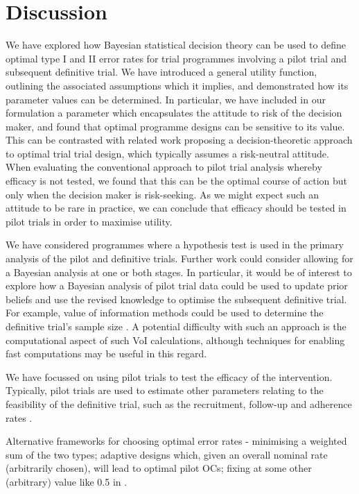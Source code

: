 \documentclass[sagev, Crown]{sagej}
\begin{document}

\section{Discussion}\label{sec:discussion}

We have explored how Bayesian statistical decision theory can be used to define optimal type I and II error rates for trial programmes involving a pilot trial and subsequent definitive trial. We have introduced a general utility function, outlining the associated assumptions which it implies, and demonstrated how its parameter values can be determined. In particular, we have included in our formulation a parameter which encapsulates the attitude to risk of the decision maker, and found that optimal programme designs can be sensitive to its value. This can be contrasted with related work proposing a decision-theoretic approach to optimal trial trial design, which typically assumes a risk-neutral attitude. When evaluating the conventional approach to pilot trial analysis whereby efficacy is not tested, we found that this can be the optimal course of action but only when the decision maker is risk-seeking. As we might expect such an attitude to be rare in practice, we can conclude that efficacy should be tested in pilot trials in order to maximise utility.

We have considered programmes where a hypothesis test is used in the primary analysis of the pilot and definitive trials. Further work could consider allowing for a Bayesian analysis at one or both stages. In particular, it would be of interest to explore how a Bayesian analysis of pilot trial data could be used to update prior beliefs and use the revised knowledge to optimise the subsequent definitive trial. For example, value of information methods could be used to determine the definitive trial's sample size \cite{Willan2005}. A potential difficulty with such an approach is the computational aspect of such VoI calculations, although techniques for enabling fast computations may be useful in this regard\cite{Strong2015}. 

We have focussed on using pilot trials to test the efficacy of the intervention. Typically, pilot trials are used to estimate other parameters relating to the feasibility of the definitive trial, such as the recruitment, follow-up and adherence rates \cite{Avery2017}.

Alternative frameworks for choosing optimal error rates - minimising a weighted sum of the two types; adaptive designs which, given an overall nominal rate (arbitrarily chosen), will lead to optimal pilot OCs; fixing at some other (arbitrary) value like 0.5 in \cite{Cocks2013}.
\end{document}
